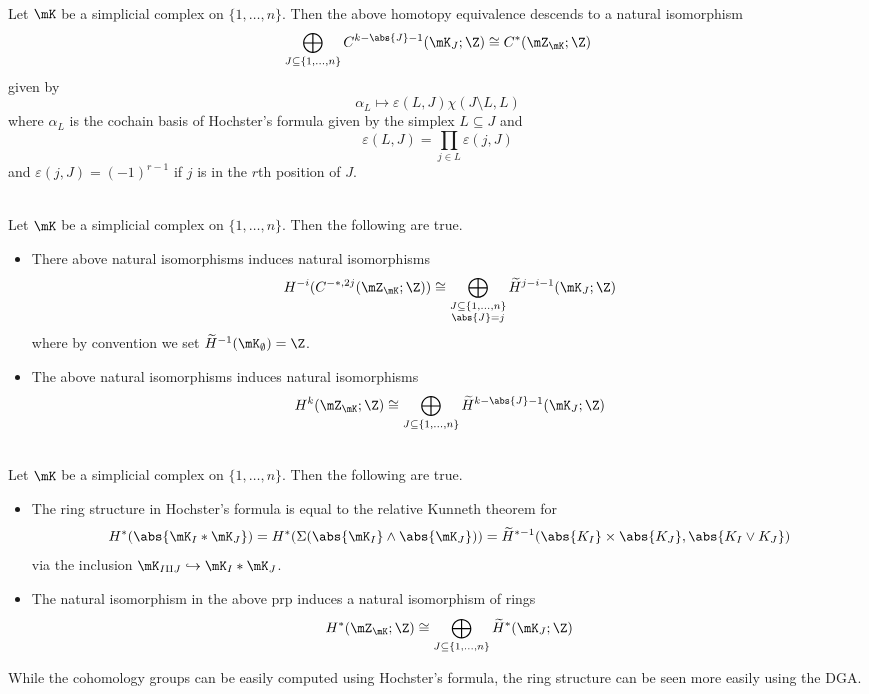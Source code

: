 \documentclass[a4paper]{article}
\begin{document}
\begin{crl}{}{}\\
Let $\mK$ be a simplicial complex on $\{1,\dots,n\}$. Then the above homotopy equivalence descends to a natural isomorphism $$\bigoplus_{J\subseteq\{1,\dots,n\}}C^{k-\abs{J}-1}(\mK_J;\Z)\cong C^\ast(\mZ_\mK;\Z)$$ given by $$\alpha_L\mapsto\varepsilon(L,J)\chi(J\setminus L,L)$$ where $\alpha_L$ is the cochain basis of Hochster's formula given by the simplex $L\subseteq J$ and $$\varepsilon(L,J)=\prod_{j\in L}\varepsilon(j,J)$$ and $\varepsilon(j,J)=(-1)^{r-1}$ if $j$ is in the $r$th position of $J$. 
\end{crl}

\begin{prp}{}{}\\
Let $\mK$ be a simplicial complex on $\{1,\dots,n\}$. Then the following are true. 
\begin{itemize}
\item There above natural isomorphisms induces natural isomorphisms $$H^{-i}(C^{-\ast,2j}(\mZ_\mK;\Z))\cong\bigoplus_{\substack{J\subseteq\{1,\dots,n\}\\\abs{J}=j}}\widetilde{H}^{j-i-1}(\mK_J;\Z)$$ where by convention we set $\widetilde{H}^{-1}(\mK_\emptyset)=\Z$. 
\item The above natural isomorphisms induces natural isomorphisms $$H^k(\mZ_\mK;\Z)\cong\bigoplus_{J\subseteq\{1,\dots,n\}}\widetilde{H}^{k-\abs{J}-1}(\mK_J;\Z)$$
\end{itemize}
\end{prp}

\begin{prp}{}{}\\
Let $\mK$ be a simplicial complex on $\{1,\dots,n\}$. Then the following are true. 
\begin{itemize}
\item The ring structure in Hochster's formula is equal to the relative Kunneth theorem for $$H^\ast(\abs{\mK_I\ast\mK_J})=H^\ast(\Sigma(\abs{\mK_I}\wedge\abs{\mK_J}))=\widetilde{H}^{\ast-1}(\abs{K_I}\times\abs{K_J},\abs{K_I\vee K_J})$$ via the inclusion $\mK_{I\amalg J}\hookrightarrow\mK_I\ast\mK_J$. 
\item The natural isomorphism in the above prp induces a natural isomorphism of rings $$H^\ast(\mZ_\mK;\Z)\cong\bigoplus_{J\subseteq\{1,\dots,n\}}\widetilde{H}^\ast(\mK_J;\Z)$$
\end{itemize}
\end{prp}

While the cohomology groups can be easily computed using Hochster's formula, the ring structure can be seen more easily using the DGA. 
\end{document}
